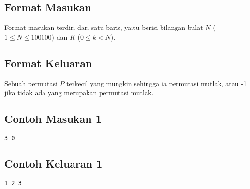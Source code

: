 \documentclass{article}
\begin{document}


\subsection*{Format Masukan}


Format masukan terdiri dari satu baris, yaitu berisi bilangan bulat $N$ ($1 \leq N \leq 100000$) dan 
$K$ ($0 \leq k < N $).

\subsection*{Format Keluaran}
Sebuah permutasi $P$ terkecil yang mungkin sehingga ia permutasi mutlak, atau -1 jika tidak ada yang merupakan permutasi mutlak.

\begin{multicols}{2}
\subsection*{Contoh Masukan 1}
\begin{lstlisting}
3 0
\end{lstlisting}
\columnbreak
\subsection*{Contoh Keluaran 1}
\begin{lstlisting}
1 2 3
\end{lstlisting}
\end{multicols}



\pagebreak
\end{document}
